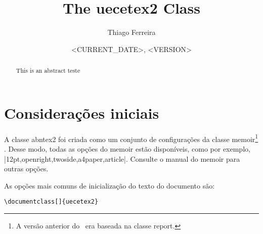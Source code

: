 \documentclass[letterpaper]{ltxdoc}
\title{The \textsf{uecetex2} Class}
\author{Thiago Ferreira}
\date{<CURRENT_DATE>, <VERSION>}
\begin{document}
\maketitle

\begin{abstract}
    This is an abstract teste
\end{abstract}

\tableofcontents

\section{Considerações iniciais}

\DescribeMacro{\documentclass}
A classe \textsf{abntex2} foi criada como um conjunto de configurações da classe
\textsf{memoir}\footnote{A versão anterior do ~era baseada na classe
\textsf{report}.} \cite{memoir}. Desse modo, todas as opções do \textsf{memoir}
estão disponíveis, como por exemplo, |12pt,openright,twoside,a4paper,article|.
Consulte o manual do \textsf{memoir} para outras opções.

As opções mais comuns de inicialização do texto do documento são:

\begin{verbatim}
\documentclass[]{uecetex2}
\end{verbatim}
\end{document}
